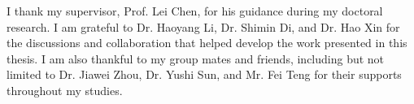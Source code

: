 I thank my supervisor, Prof. Lei Chen, for his guidance during my doctoral research. I am grateful to Dr. Haoyang Li, Dr. Shimin Di, and Dr. Hao Xin for the discussions and collaboration that helped develop the work presented in this thesis. 
I am also thankful to my group mates and friends, including but not limited to Dr. Jiawei Zhou, Dr. Yushi Sun, and Mr. Fei Teng for their supports throughout my studies.
